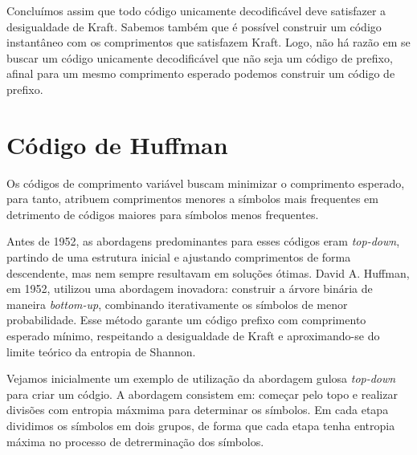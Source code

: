 Concluímos assim que todo código unicamente decodificável deve satisfazer
a desigualdade de Kraft. Sabemos também que é possível construir um código
instantâneo com os comprimentos que satisfazem Kraft. Logo, não há razão 
em se buscar um código unicamente decodificável que não seja um código de
prefixo, afinal para um mesmo comprimento esperado podemos construir um
código de prefixo.




\section{Código de Huffman}

Os códigos de comprimento variável buscam minimizar o comprimento esperado,
para tanto, atribuem comprimentos menores a símbolos mais frequentes em detrimento
de códigos maiores para símbolos menos frequentes.

Antes de 1952, as abordagens predominantes para esses códigos eram
\emph{top-down}, partindo de uma estrutura inicial e ajustando comprimentos de forma
descendente, mas nem sempre resultavam em soluções ótimas.
David A. Huffman, em 1952, utilizou uma abordagem inovadora: construir a
árvore binária de maneira \emph{bottom-up}, combinando iterativamente os símbolos
de menor probabilidade. Esse método garante um código prefixo com comprimento
esperado mínimo, respeitando a desigualdade de Kraft e aproximando-se do limite
teórico da entropia de Shannon.

Vejamos inicialmente um exemplo de utilização da abordagem gulosa \emph{top-down}
para criar um códgio. A abordagem consistem em: começar pelo topo e 
realizar divisões com entropia máxmima para determinar os símbolos.
Em cada etapa dividimos os símbolos em dois grupos, de forma que cada etapa
tenha entropia máxima no processo de detrerminação dos símbolos.


